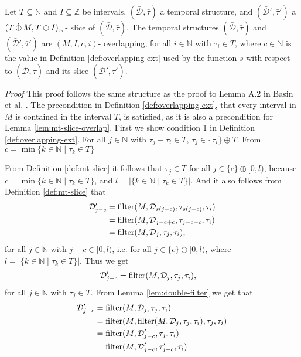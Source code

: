 \begin{lemma}
    \label{lem:mt-slice-overlap}
    Let $T \subseteq \mathbb{N}$ and $I \subseteq \mathbb{Z}$ be intervals, 
    $(\bar{\mathcal{D}}, \bar{\tau})$ a temporal structure, and $(\bar{\mathcal{D}}', \bar{\tau}')$ a $(T \,\dot{\oplus}\, M, T \oplus I)_{\tau_i}$- slice of $(\bar{\mathcal{D}}, \bar{\tau})$.
    The temporal structures $(\bar{\mathcal{D}}, \bar{\tau})$ and $(\bar{\mathcal{D}}', \bar{\tau}')$ are $(M,I,c,i)$- overlapping, for all $i \in \mathbb{N}$ with $\tau_i \in T$, where $c \in \mathbb{N}$ is the value in Definition \ref{def:overlapping-ext} used by the function $s$ with respect to $(\bar{\mathcal{D}}, \bar{\tau})$ and its slice $(\bar{\mathcal{D}}', \bar{\tau}')$.
\end{lemma}
\textit{Proof}
This proof follows the same structure as the proof to Lemma A.2 in Basin et al. \cite{Basin2016}.
The precondition in Definition \ref{def:overlapping-ext}, that every interval in $M$ is contained in the interval $T$, is satisfied, as it is also a precondition for Lemma \ref{lem:mt-slice-overlap}.
First we show condition 1 in Definition \ref{def:overlapping-ext}.
For all $j \in \mathbb{N}$ with $\tau_j - \tau_i \in T$, $\tau_j \in \{\tau_i\} \oplus T$.
From $c = \min\{k \in \mathbb{N} \mid \tau_k \in T \}$ 


From Definition \ref{def:mt-slice} it follows that $\tau_{j} \in T$ for all $j \in \{c\} \oplus [0,l)$, because $c = \min\{k \in \mathbb{N} \mid \tau_k \in T \}$, and $l = |\{k \in \mathbb{N} \mid \tau_k \in T\}|$.
And it also follows from Definition \ref{def:mt-slice} that
\begin{align*}
    \mathcal{D}'_{j-c}
    & = \operatorname{filter}(M, \mathcal{D}_{s(j-c)}, \tau_{s(j-c)}, \tau_i) \\
    & = \operatorname{filter}(M, \mathcal{D}_{j-c+c}, \tau_{j-c+c}, \tau_i) \\
    & = \operatorname{filter}(M, \mathcal{D}_{j}, \tau_{j}, \tau_i), 
\end{align*}
for all $j \in \mathbb{N}$ with $j-c \in [0,l)$, i.e. for all $j \in \{c\} \oplus [0,l)$, where $l = |\{k \in \mathbb{N} \mid \tau_k \in T \}|$.
Thus we get
\begin{align*}
    \mathcal{D}'_{j-c}
    & = \operatorname{filter}(M, \mathcal{D}_{j}, \tau_{j}, \tau_i), 
\end{align*}
for all $j \in \mathbb{N}$ with $\tau_j \in T$.
From Lemma \ref{lem:double-filter} we get that
\begin{align*}
    \mathcal{D}'_{j-c}
    &= \operatorname{filter}(M, \mathcal{D}_j, \tau_j, \tau_i) \\
    &= \operatorname{filter}(M, \operatorname{filter}(M, \mathcal{D}_j, \tau_j, \tau_i), \tau_j, \tau_i) \\
    &= \operatorname{filter}(M, \mathcal{D}'_{j-c}, \tau_j, \tau_i) \\
    &= \operatorname{filter}(M, \mathcal{D}'_{j-c}, \tau'_{j-c}, \tau_i) \\
\end{align*}